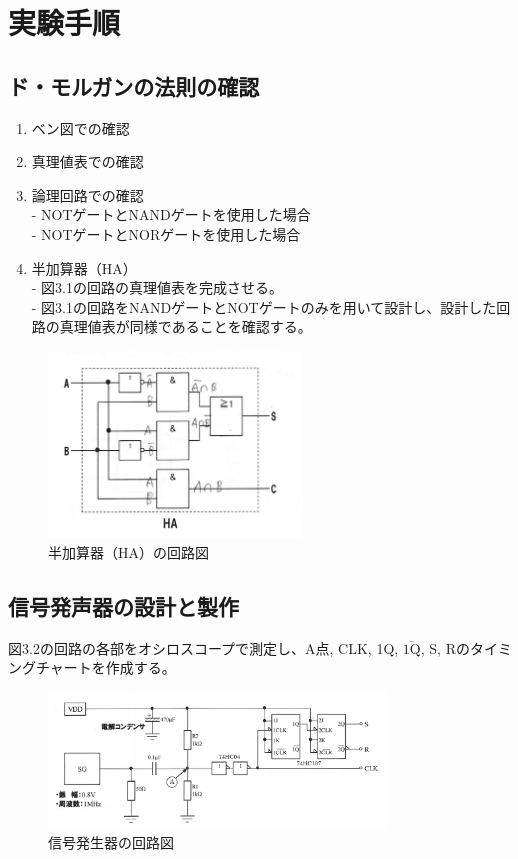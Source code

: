 \documentclass{jlreq}
\numberwithin{equation}{section}
\begin{document}
\section{実験手順}
\subsection{ド・モルガンの法則の確認}
\begin{enumerate}
  \item ベン図での確認
  \item 真理値表での確認
  \item 論理回路での確認 \\
  - NOTゲートとNANDゲートを使用した場合 \\
  - NOTゲートとNORゲートを使用した場合
  \item 半加算器（HA） \\
  - 図3.1の回路の真理値表を完成させる。 \\
  - 図3.1の回路をNANDゲートとNOTゲートのみを用いて設計し、設計した回路の真理値表が同様であることを確認する。
\end{enumerate}

\begin{figure}[H]
  \centering
  \includegraphics[width=0.6\textwidth]{assets/HAkairo.png}
  \caption{半加算器（HA）の回路図}
\end{figure}

\subsection{信号発声器の設計と製作}
図3.2の回路の各部をオシロスコープで測定し、A点, CLK, 1Q, \(\overline{\text{1Q}}\), S, Rのタイミングチャートを作成する。

\begin{figure}[H]
  \centering
  \includegraphics[width=0.8\textwidth]{assets/SGkairo.png}
  \caption{信号発生器の回路図}
\end{figure}
\end{document}
